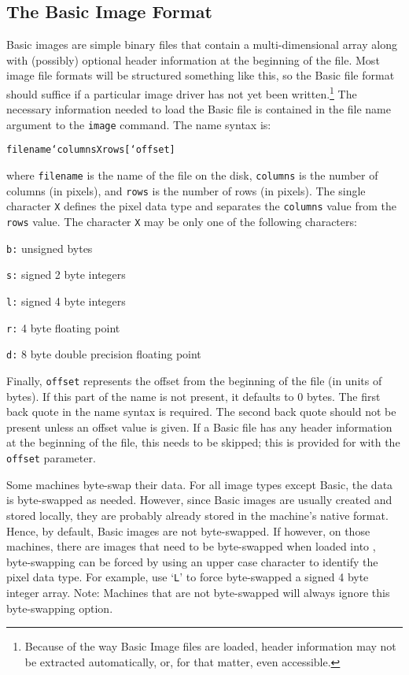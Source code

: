 \subsection*		{The Basic Image Format}

Basic images
are simple binary files that contain a
multi-dimensional array along with (possibly) optional
header information at the beginning of the file.
Most image file formats will be structured something like this,
so the Basic file format should suffice if a particular image driver has not
yet been written.\footnote{Because of the way
Basic Image files are loaded, header information may not be extracted
automatically, or, for that matter, even accessible.}
The necessary information needed to load the Basic file is contained in
the file name argument to the
{\tt image}%
command.
The name syntax is:
\begin{center}
  {\tt filename`columnsXrows[`offset]}
\end{center}
where {\tt filename} is the name of the file on the disk,
{\tt columns} is the number of columns (in pixels), and
{\tt rows} is the number of rows (in pixels).
The single character {\tt X} defines the pixel data type and
separates the {\tt columns} value from the {\tt rows} value.
The character {\tt X} may be only one of the following characters:
\begin{wiplist}%
  \item [{\tt b:}] unsigned bytes
\samepage
  \item [{\tt s:}] signed 2 byte integers
  \item [{\tt l:}] signed 4 byte integers
  \item [{\tt r:}] 4 byte floating point
  \item [{\tt d:}] 8 byte double precision floating point
\end{wiplist}
Finally, {\tt offset} represents the offset from the beginning of
the file (in units of bytes).
If this part of the name is not present, it defaults to 0 bytes.
The first back quote in the name syntax is required.
The second back quote should not be present unless an offset value is given.
If a Basic file has any header information at the beginning of the file,
this needs to be skipped;
this is provided for with the {\tt offset} parameter.

Some machines byte-swap
their data.
For all image types except Basic, the data is byte-swapped as needed.
However, since Basic images are usually created and stored locally,
they are probably already stored in the machine's native format.
Hence, by default, Basic images are not byte-swapped.
If however, on those machines, there are images that need to be
byte-swapped when loaded into \wip,
byte-swapping can be forced by using an upper case character
to identify the pixel data type.
For example, use `{\tt L}' to force byte-swapped a signed 4 byte integer array.
{\sc Note}: Machines that are not byte-swapped will always ignore this
byte-swapping option.

